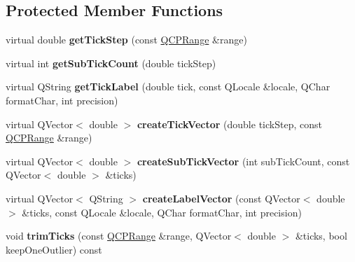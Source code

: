\subsection*{Protected Member Functions}
\begin{DoxyCompactItemize}
\item 
virtual double {\bfseries get\+Tick\+Step} (const \hyperlink{classQCPRange}{Q\+C\+P\+Range} \&range)\hypertarget{classQCPAxisTicker_a910d69bcec2de37e92d8d4e1ecf201e2}{}\label{classQCPAxisTicker_a910d69bcec2de37e92d8d4e1ecf201e2}

\item 
virtual int {\bfseries get\+Sub\+Tick\+Count} (double tick\+Step)\hypertarget{classQCPAxisTicker_a4ccc403ced7a1457ce6ba293509933c8}{}\label{classQCPAxisTicker_a4ccc403ced7a1457ce6ba293509933c8}

\item 
virtual Q\+String {\bfseries get\+Tick\+Label} (double tick, const Q\+Locale \&locale, Q\+Char format\+Char, int precision)\hypertarget{classQCPAxisTicker_a8201eb4aa8be192bf786b126eb5ee089}{}\label{classQCPAxisTicker_a8201eb4aa8be192bf786b126eb5ee089}

\item 
virtual Q\+Vector$<$ double $>$ {\bfseries create\+Tick\+Vector} (double tick\+Step, const \hyperlink{classQCPRange}{Q\+C\+P\+Range} \&range)\hypertarget{classQCPAxisTicker_af4645a824c7bd2ca8fc7e86ebf9055bd}{}\label{classQCPAxisTicker_af4645a824c7bd2ca8fc7e86ebf9055bd}

\item 
virtual Q\+Vector$<$ double $>$ {\bfseries create\+Sub\+Tick\+Vector} (int sub\+Tick\+Count, const Q\+Vector$<$ double $>$ \&ticks)\hypertarget{classQCPAxisTicker_a9a6435723fa0bd366d1ea4c2cff7c33f}{}\label{classQCPAxisTicker_a9a6435723fa0bd366d1ea4c2cff7c33f}

\item 
virtual Q\+Vector$<$ Q\+String $>$ {\bfseries create\+Label\+Vector} (const Q\+Vector$<$ double $>$ \&ticks, const Q\+Locale \&locale, Q\+Char format\+Char, int precision)\hypertarget{classQCPAxisTicker_a804050e408f37a0b9770c6654ebe6aa7}{}\label{classQCPAxisTicker_a804050e408f37a0b9770c6654ebe6aa7}

\item 
void {\bfseries trim\+Ticks} (const \hyperlink{classQCPRange}{Q\+C\+P\+Range} \&range, Q\+Vector$<$ double $>$ \&ticks, bool keep\+One\+Outlier) const \hypertarget{classQCPAxisTicker_a7eaaf1a0bf7807fe95e36d40e3b3ed65}{}\label{classQCPAxisTicker_a7eaaf1a0bf7807fe95e36d40e3b3ed65}


\end{DoxyCompactItemize}
